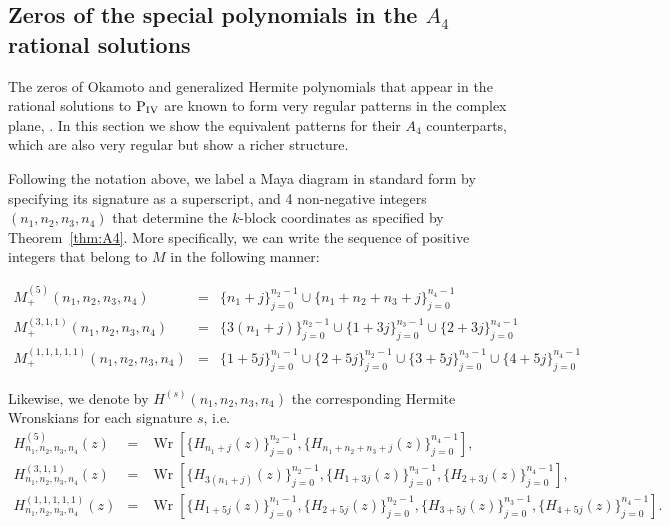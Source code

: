 \documentclass[10pt]{amsart}
\theoremstyle{definition}
\numberwithin{equation}{section}
\numberwithin{figure}{section}
\newcommand{\Wr}{\operatorname{Wr}}
\newcommand{\Pfour}{{\rm P_{IV}}}
\begin{document}
\subsection{Zeros of the special polynomials in the $A_4$ rational solutions}

The zeros of Okamoto and generalized Hermite polynomials that appear in the rational solutions to $\Pfour$ are known to form very regular patterns in the complex plane, \cite{clarkson2003fourth}. In this section we show the equivalent patterns for their $A_4$ counterparts, which are also very regular but show a richer structure.

Following the notation above, we label a Maya diagram in standard form by specifying its signature as a superscript, and 4 non-negative integers $(n_1,n_2,n_3,n_4)$ that  determine the $k$-block coordinates as specified by Theorem~\ref{thm:A4}. More specifically, we can write the sequence of positive integers that belong to $M$ in the following manner:

\begin{eqnarray*}
 M_+^{(5)}(n_1,n_2,n_3,n_4)&=& \Big\{ n_1+j  \Big\}_{j=0}^{n_2-1}\cup \Big\{ n_1+n_2+n_3+j  \Big\}_{j=0}^{n_4-1}\\
 M_+^{(3,1,1)}(n_1,n_2,n_3,n_4)&=&\Big\{ 3(n_1+j)  \Big\}_{j=0}^{n_2-1}\cup \Big\{ 1+3j  \Big\}_{j=0}^{n_3-1} \cup \Big\{ 2+3j  \Big\}_{j=0}^{n_4-1}\\
  M_+^{(1,1,1,1,1)}(n_1,n_2,n_3,n_4)&=&\Big\{ 1+5j  \Big\}_{j=0}^{n_1-1}\cup \Big\{ 2+5j  \Big\}_{j=0}^{n_2-1}\cup \Big\{ 3+5j  \Big\}_{j=0}^{n_3-1} \cup \Big\{ 4+5j  \Big\}_{j=0}^{n_4-1}
 \end{eqnarray*}
 
 Likewise, we denote by $H^{(s)}(n_1,n_2,n_3,n_4)$ the corresponding Hermite Wronskians for each signature $s$, i.e.
 \begin{eqnarray*}
   H^{(5)}_{n_1,n_2,n_3,n_4}(z)   &=& \Wr\left[ \Big\{ H_{n_1+j} (z) \Big\}_{j=0}^{n_2-1}, \Big\{ H_{n_1+n_2+n_3+j}(z)  \Big\}_{j=0}^{n_4-1}\right], \\
 H^{(3,1,1)}_{n_1,n_2,n_3,n_4}(z)&=& \Wr\left[ \Big\{H_{ 3(n_1+j)} (z) \Big\}_{j=0}^{n_2-1}, \Big\{H_{ 1+3j}(z)  \Big\}_{j=0}^{n_3-1} , \Big\{ H_{2+3j}(z)  \Big\}_{j=0}^{n_4-1}\right],\\
  H^{(1,1,1,1,1)}_{n_1,n_2,n_3,n_4}(z)&=& \Wr\left[ \Big\{ H_{1+5j} (z) \Big\}_{j=0}^{n_1-1}, \Big\{ H_{2+5j} (z) \Big\}_{j=0}^{n_2-1}, \Big\{ H_{3+5j} (z) \Big\}_{j=0}^{n_3-1} , \Big\{ H_{4+5j}(z)  \Big\}_{j=0}^{n_4-1}\right].
 \end{eqnarray*}
\end{document}

